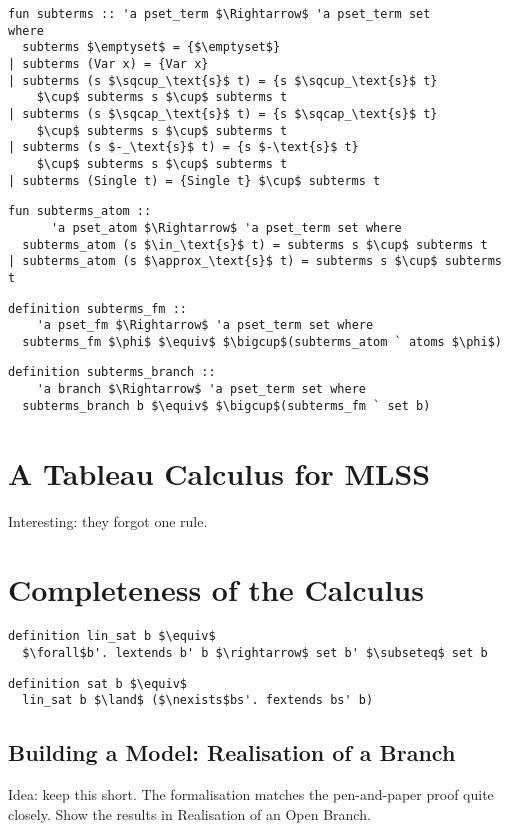 \documentclass[sigplan,10pt,anonymous,review]{acmart}
\begin{document}
\begin{lstlisting}
fun subterms :: 'a pset_term $\Rightarrow$ 'a pset_term set
where
  subterms $\emptyset$ = {$\emptyset$}
| subterms (Var x) = {Var x}
| subterms (s $\sqcup_\text{s}$ t) = {s $\sqcup_\text{s}$ t}
    $\cup$ subterms s $\cup$ subterms t
| subterms (s $\sqcap_\text{s}$ t) = {s $\sqcap_\text{s}$ t}
    $\cup$ subterms s $\cup$ subterms t
| subterms (s $-_\text{s}$ t) = {s $-\text{s}$ t}
    $\cup$ subterms s $\cup$ subterms t
| subterms (Single t) = {Single t} $\cup$ subterms t
\end{lstlisting}

\begin{lstlisting}
fun subterms_atom ::
      'a pset_atom $\Rightarrow$ 'a pset_term set where
  subterms_atom (s $\in_\text{s}$ t) = subterms s $\cup$ subterms t
| subterms_atom (s $\approx_\text{s}$ t) = subterms s $\cup$ subterms t
\end{lstlisting}

\begin{lstlisting}
definition subterms_fm ::
    'a pset_fm $\Rightarrow$ 'a pset_term set where
  subterms_fm $\phi$ $\equiv$ $\bigcup$(subterms_atom ` atoms $\phi$)
\end{lstlisting}

\begin{lstlisting}
definition subterms_branch ::
    'a branch $\Rightarrow$ 'a pset_term set where
  subterms_branch b $\equiv$ $\bigcup$(subterms_fm ` set b)
\end{lstlisting}

\section{A Tableau Calculus for MLSS}
Interesting: they forgot one rule.

\section{Completeness of the Calculus}
\begin{lstlisting}
definition lin_sat b $\equiv$
  $\forall$b'. lextends b' b $\rightarrow$ set b' $\subseteq$ set b
\end{lstlisting}

\begin{lstlisting}
definition sat b $\equiv$
  lin_sat b $\land$ ($\nexists$bs'. fextends bs' b)
\end{lstlisting}

\subsection{Building a Model: Realisation of a Branch}
Idea: keep this short. The formalisation matches the pen-and-paper proof quite closely.
Show the results in Realisation of an Open Branch.
\end{document}
